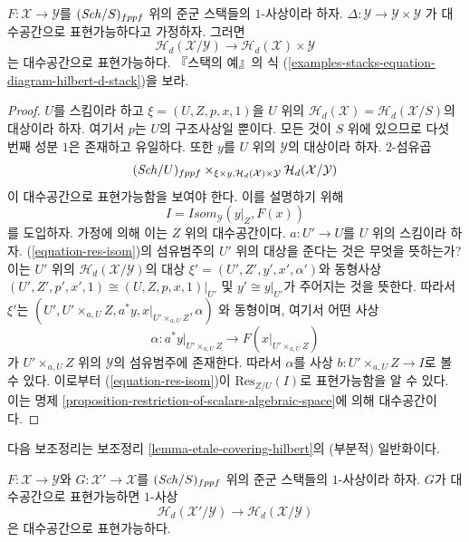\begin{lemma}
\label{lemma-relative-hilbert}
$F : \mathcal{X} \to \mathcal{Y}$를 $(\mathit{Sch}/S)_{fppf}$ 위의
준군 스택들의 $1$-사상이라 하자.
$\Delta : \mathcal{Y} \to \mathcal{Y} \times \mathcal{Y}$
가 대수공간으로 표현가능하다고 가정하자. 그러면
$$
\mathcal{H}_d(\mathcal{X}/\mathcal{Y})
\longrightarrow
\mathcal{H}_d(\mathcal{X}) \times \mathcal{Y}
$$
는 대수공간으로 표현가능하다. 『스택의 예』의 식
(\ref{examples-stacks-equation-diagram-hilbert-d-stack})을 보라.
\end{lemma}

\begin{proof}
$U$를 스킴이라 하고 $\xi = (U, Z, p, x, 1)$을 $U$ 위의
$\mathcal{H}_d(\mathcal{X}) = \mathcal{H}_d(\mathcal{X}/S)$의
대상이라 하자. 여기서 $p$는 $U$의 구조사상일 뿐이다.
모든 것이 $S$ 위에 있으므로 다섯 번째 성분 $1$은 존재하고 유일하다.
또한 $y$를 $U$ 위의 $\mathcal{Y}$의 대상이라 하자.
$2$-섬유곱
\begin{equation}
\label{equation-res-isom}
(\mathit{Sch}/U)_{fppf}
\times_{\xi \times y, \mathcal{H}_d(\mathcal{X}) \times \mathcal{Y}}
\mathcal{H}_d(\mathcal{X}/\mathcal{Y})
\end{equation}
이 대수공간으로 표현가능함을 보여야 한다. 이를 설명하기 위해
$$
I = \mathit{Isom}_\mathcal{Y}(y|_Z, F(x))
$$
를 도입하자. 가정에 의해 이는 $Z$ 위의 대수공간이다.
$a : U' \to U$를 $U$ 위의 스킴이라 하자.
(\ref{equation-res-isom})의 섬유범주의 $U'$ 위의 대상을 준다는 것은
무엇을 뜻하는가? 이는 $U'$ 위의
$\mathcal{H}_d(\mathcal{X}/\mathcal{Y})$의 대상
$\xi' = (U', Z', y', x', \alpha')$와 동형사상
$(U', Z', p', x', 1) \cong (U, Z, p, x, 1)|_{U'}$ 및
$y' \cong y|_{U'}$가 주어지는 것을 뜻한다. 따라서 $\xi'$는
$(U', U' \times_{a, U} Z, a^*y, x|_{U' \times_{a, U} Z}, \alpha)$
와 동형이며, 여기서 어떤 사상
$$
\alpha :
a^*y|_{U' \times_{a, U} Z}
\longrightarrow
F(x|_{U' \times_{a, U} Z})
$$
가 $U' \times_{a, U} Z$ 위의 $\mathcal{Y}$의 섬유범주에 존재한다.
따라서 $\alpha$를 사상 $b : U' \times_{a, U} Z \to I$로 볼 수 있다.
이로부터 (\ref{equation-res-isom})이 $\text{Res}_{Z/U}(I)$로
표현가능함을 알 수 있다. 이는 명제
\ref{proposition-restriction-of-scalars-algebraic-space}에 의해
대수공간이다.
\end{proof}

\noindent
다음 보조정리는 보조정리
\ref{lemma-etale-covering-hilbert}의 (부분적) 일반화이다.

\begin{lemma}
\label{lemma-representable-on-top}
$F : \mathcal{X} \to \mathcal{Y}$와 $G : \mathcal{X}' \to \mathcal{X}$를
$(\mathit{Sch}/S)_{fppf}$ 위의 준군 스택들의 $1$-사상이라 하자.
$G$가 대수공간으로 표현가능하면 $1$-사상
$$
\mathcal{H}_d(\mathcal{X}'/\mathcal{Y})
\longrightarrow
\mathcal{H}_d(\mathcal{X}/\mathcal{Y})
$$
은 대수공간으로 표현가능하다.
\end{lemma}

